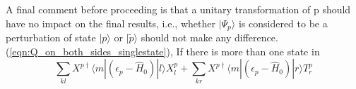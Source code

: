 \documentclass[12pt]{article}
\begin{document}
\noindent  A final comment before proceeding is that a unitary transformation of
$\mathrm{p}$ should have no impact on the final results, i.e., whether $|\Psi_{p} \rangle$
is considered to be a perturbation of state $|p\rangle$ or $|\tilde{p}\rangle$ should
not make any difference. \\



(\ref{eqn:Q_on_both_sides_singlestate}),
If there is more than one state in  
\begin{equation*}
  \sum_{kl}X^{p\dagger}\langle m | (\epsilon_{p} - \hat{H}_{0}) | l \rangle X_{l}^{p}
+ \sum_{kr}X^{p\dagger}\langle m | (\epsilon_{p} - \hat{H}_{0}) | r \rangle T_{r}^{p}
\end{equation*}
\end{document}
